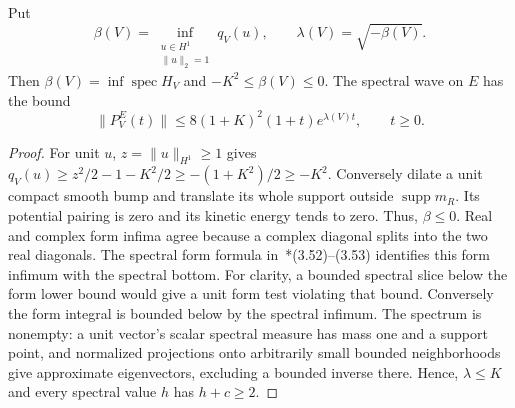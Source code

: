 \begin{lemma}\label{L:signed-spectral-wave}
  Put
  \[
    \beta(V)=\inf_{\substack{u\in H^1\\\|u\|_2=1}}q_V(u),
    \qquad \lambda(V)=\sqrt{-\beta(V)} .
  \]
  Then $\beta(V)=\inf\operatorname{spec}H_V$ and
  $-K^2\le\beta(V)\le0$.
  The spectral wave on $E$ has the bound
  \begin{equation}\label{E:signed-E-wave}
    \|P_V^E(t)\|\le8(1+K)^2(1+t)e^{\lambda(V)t},\qquad t\ge0.
  \end{equation}
\end{lemma}

\begin{proof}
  For unit $u$, $z=\|u\|_{H^1}\ge1$ gives
  $q_V(u)\ge z^2/2-1-K^2/2\ge-(1+K^2)/2\ge-K^2$.
  Conversely dilate a unit compact smooth bump and translate its
  whole support outside $\operatorname{supp}m_R$.
  Its potential pairing is zero and its kinetic energy tends to zero.
  Thus, $\beta\le0$. Real and complex form infima agree because
  a complex diagonal splits into the two real diagonals.
  The spectral form formula in~\cite{teschl:14:mathematical}*{(3.52)--(3.53)}
  identifies this form infimum with the spectral bottom.
  For clarity, a bounded spectral slice below the form lower bound
  would give a unit form test violating that bound.
  Conversely the form integral is bounded below by the spectral infimum.
  The spectrum is nonempty: a unit vector's scalar spectral measure
  has mass one and a support point, and normalized projections onto
  arbitrarily small bounded neighborhoods give approximate eigenvectors,
  excluding a bounded inverse there.
  Hence, $\lambda\le K$ and every spectral value $h$ has $h+c\ge2$.


\end{proof}
